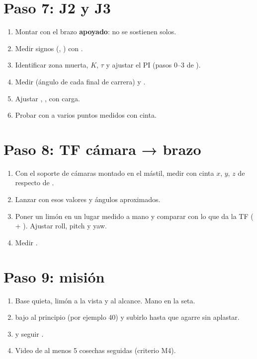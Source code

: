 \section{Paso 7: J2 y J3}
\begin{enumerate}
  \item Montar con el brazo \textbf{apoyado}: no se sostienen solos.
  \item Medir signos (, ) con .
  \item Identificar zona muerta, $K$, $\tau$ y ajustar el PI (pasos 0--3 de ).
  \item Medir  (ángulo de cada final de carrera) y .
  \item Ajustar , ,  con carga.
  \item Probar  con  a varios puntos medidos con cinta.
\end{enumerate}

\section{Paso 8: TF cámara → brazo}
\begin{enumerate}
  \item Con el soporte de cámaras montado en el mástil, medir con cinta $x$, $y$, $z$ de 
        respecto de .
  \item Lanzar  con esos valores y ángulos aproximados.
  \item Poner un limón en un lugar medido a mano y comparar con lo que da la TF
        ( + ). Ajustar roll, pitch y yaw.
  \item Medir .
\end{enumerate}

\section{Paso 9: misión}
\begin{enumerate}
  \item Base quieta, limón a la vista y al alcance. Mano en la seta.
  \item {} bajo al principio (por ejemplo 40) y subirlo hasta que agarre sin aplastar.
  \item {} y seguir .
  \item Video de al menos 5 cosechas seguidas (criterio M4).
\end{enumerate}

